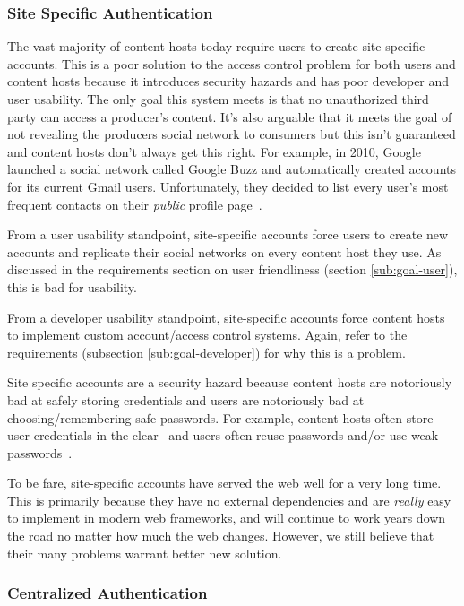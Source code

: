 \documentclass[pdftex,12pt,a4papaer,twoside,notitlepage]{report}
\begin{document}
\subsubsection{Site Specific Authentication}

The vast majority of content hosts today require users to create site-specific
accounts. This is a poor solution to the access control problem for both users
and content hosts because it introduces security hazards and has poor developer
and user usability. The only goal this system meets is that no unauthorized
third party can access a producer's content. It's also arguable that it meets
the goal of not revealing the producers social network to consumers but this
isn't guaranteed and content hosts don't always get this right. For example, in
2010, Google launched a social network called Google Buzz and automatically
created accounts for its current Gmail users. Unfortunately, they decided to
list every user's most frequent contacts on their \emph{public} profile
page~\cite{google-buzz}.

From a user usability standpoint, site-specific accounts force users to create
new accounts and replicate their social networks on every content host they use.
As discussed in the requirements section on user friendliness (section
\ref{sub:goal-user}), this is bad for usability.

From a developer usability standpoint, site-specific accounts force content
hosts to implement custom account/access control systems. Again, refer to the
requirements (subsection \ref{sub:goal-developer}) for why this is a problem.

Site specific accounts are a security hazard because content hosts are
notoriously bad at safely storing credentials and users are notoriously bad at
choosing/remembering safe passwords. For example, content hosts often store user
credentials in the clear~\cite{plaintext} and users often reuse passwords and/or
use weak passwords~\cite{ms-passwords}.

To be fare, site-specific accounts have served the web well for a very long
time. This is primarily because they have no external dependencies and are
\emph{really} easy to implement in modern web frameworks, and will continue to
work years down the road no matter how much the web changes. However, we still
believe that their many problems warrant better new solution.

\subsubsection{Centralized Authentication}
\end{document}
